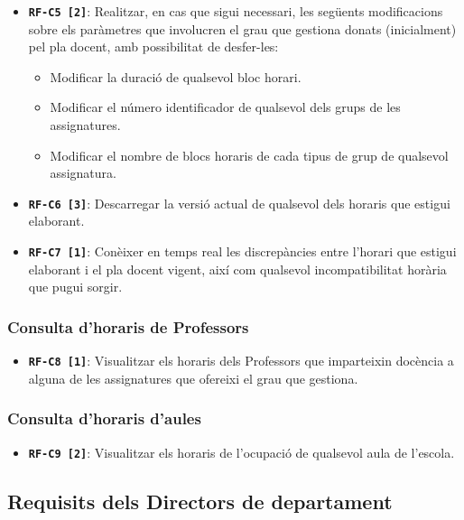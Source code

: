 \documentclass[a4paper,12pt]{ThesisStyle}
\begin{document}
\begin{itemize}
\begin{itemize}
        \end{itemize}
  \item \texttt{\textbf{RF-C5 [2]}}: Realitzar, en cas que sigui necessari, les següents modificacions sobre els paràmetres que involucren el grau que gestiona donats (inicialment) pel pla docent, amb possibilitat de desfer-les:
        \begin{itemize}
          \item Modificar la duració de qualsevol bloc horari.
          \item Modificar el número identificador de qualsevol dels grups de les assignatures.
          \item Modificar el nombre de blocs horaris de cada tipus de grup de qualsevol assignatura.
        \end{itemize}
  \item \texttt{\textbf{RF-C6 [3]}}: Descarregar la versió actual de qualsevol dels horaris que estigui elaborant.
  \item \texttt{\textbf{RF-C7 [1]}}: Conèixer en temps real les discrepàncies entre l'horari que estigui elaborant i el pla docent vigent, així com qualsevol incompatibilitat horària que pugui sorgir.
\end{itemize}

\subsubsection{Consulta d'horaris de Professors}
\begin{itemize}
  \item \texttt{\textbf{RF-C8 [1]}}: Visualitzar els horaris dels Professors que imparteixin docència a alguna de les assignatures que ofereixi el grau que gestiona.
\end{itemize}

\subsubsection{Consulta d'horaris d'aules}
\begin{itemize}
  \item \texttt{\textbf{RF-C9 [2]}}: Visualitzar els horaris de l'ocupació de qualsevol aula de l'escola.
\end{itemize}


\subsection{Requisits dels Directors de departament}
\label{subsec:requisits_director_departament}
\end{document}
